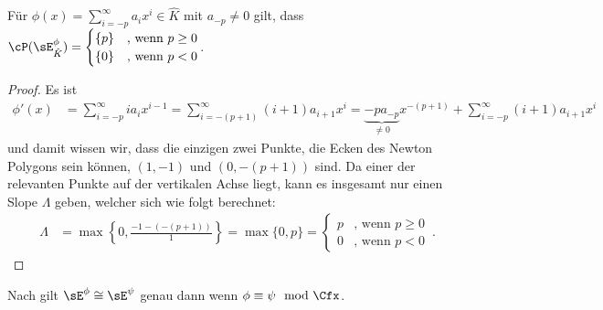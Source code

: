 \begin{lem}
Für $\phi(x)=\sum_{i=-p}^\infty a_ix^i\in\hat K$ mit $a_{-p}\neq0$ gilt, dass
$\cP(\sE_{\hat K}^\phi)=
\begin{cases}
\{p\} &\text{, wenn }p\geq0
\\\{0\} &\text{, wenn }p<0
\end{cases}
$.
\end{lem}
\begin{proof} 
Es ist 
\begin{align*}
\phi'(x) &=\sum_{i=-p}^\infty ia_ix^{i-1}
  =\sum_{i=-(p+1)}^\infty (i+1)a_{i+1}x^{i}
=\underset{\neq0}{\underbrace{-pa_{-p}}}x^{-(p+1)}
  +\sum_{i=-{p}}^\infty (i+1)a_{i+1}x^{i}
\end{align*}
und damit wissen wir, dass die einzigen zwei Punkte, die Ecken des Newton
Polygons sein können, $(1,-1)$ und $(0,-(p+1))$ sind. Da einer der relevanten
Punkte auf der vertikalen Achse liegt, kann es insgesamt nur einen Slope
$\Lambda$ geben, welcher sich wie folgt berechnet:
\begin{align*}
\Lambda&=\max\left\{0,\frac{-1-(-(p+1))}{1}\right\}
=\max\{0,p\}
=\begin{cases}
  p &\text{, wenn }p\geq0
\\0 &\text{, wenn }p<0
\end{cases} \,.
\end{align*}

\iffalse
\begin{figure}[H] %
\begin{center}
  \begin{tikzpicture}[scale=1,descr/.style={fill=white,inner sep=2.5pt}]
  \def\myPoints{0/-6,1/-1}
  \def\myPath{ -- node[descr]{$p$} (1,-1)}
  \myPlotFunction[nogrid]{\myPoints}{\myPath}{1}{-6}{0}{$N(\sE_{\hat K}^\phi)$}
  \end{tikzpicture}
\end{center}
\caption{Newton-Polygon zu $\sE_{\hat K}^\phi$}
\end{figure}
\fi
\end{proof}

\begin{bem} \label{bem:FormRang1VR}
Nach \cite[1.a]{sabbah_Fourier-local} gilt $\sE^\phi\cong\sE^\psi$ genau dann
wenn $\phi\equiv\psi \mod \Cfx$.
\end{bem}

